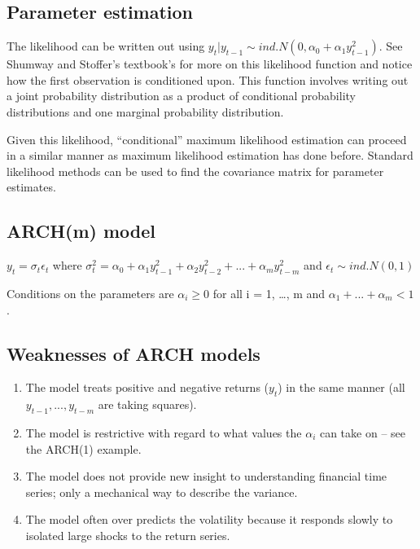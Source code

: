\documentclass[
]{book}
\providecommand{\tightlist}{%
  \setlength{\itemsep}{0pt}\setlength{\parskip}{0pt}}
\theoremstyle{definition}
\theoremstyle{definition}
\theoremstyle{definition}
\theoremstyle{definition}
\theoremstyle{remark}
\begin{document}
\hypertarget{parameter-estimation}{%
\subsection{Parameter estimation}\label{parameter-estimation}}

The likelihood can be written out using \(y_t|y_{t-1} \sim ind.N(0, \alpha_0+\alpha_1y^2_{t-1})\). See Shumway and Stoffer's textbook's for more on this likelihood function and notice how the first observation is conditioned upon. This function involves writing out a joint probability distribution as a product of conditional probability distributions and one marginal probability distribution.

Given this likelihood, ``conditional'' maximum likelihood estimation can proceed in a similar manner as maximum likelihood estimation has done before. Standard likelihood methods can be used to find the covariance matrix for parameter estimates.

\hypertarget{archm-model}{%
\subsection{ARCH(m) model}\label{archm-model}}

\(y_t=\sigma_t\epsilon_t\) where \(\sigma_t^2=\alpha_0+\alpha_1y_{t-1}^2+\alpha_2y^2_{t-2}+...+\alpha_my_{t-m}^2\) and \(\epsilon_t \sim ind.N(0,1)\)

Conditions on the parameters are \(\alpha_i \ge 0\) for all i = 1, \ldots, m and \(\alpha_1 + ... + \alpha_m < 1\).

\hypertarget{weaknesses-of-arch-models}{%
\subsection{Weaknesses of ARCH models}\label{weaknesses-of-arch-models}}

\begin{enumerate}
\def\labelenumi{\arabic{enumi}.}
\tightlist
\item
  The model treats positive and negative returns (\(y_t\)) in the same manner (all \(y_{t-1},...,y_{t-m}\) are taking squares).\\
\item
  The model is restrictive with regard to what values the \(\alpha_i\) can take on -- see the ARCH(1) example.
\item
  The model does not provide new insight to understanding financial time series; only a mechanical way to describe the variance.\\
\item
  The model often over predicts the volatility because it responds slowly to isolated large shocks to the return series.
\end{enumerate}
\end{document}
